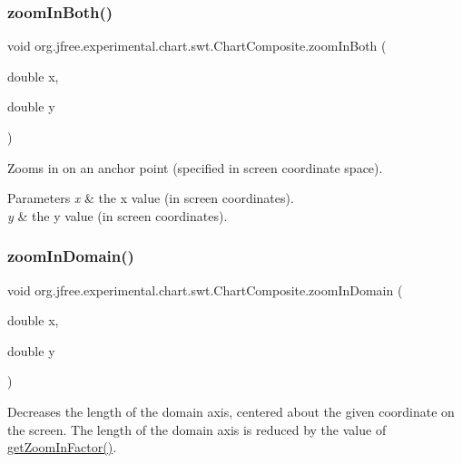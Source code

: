 \subsubsection{\texorpdfstring{zoom\+In\+Both()}{zoomInBoth()}}
{\footnotesize\ttfamily void org.\+jfree.\+experimental.\+chart.\+swt.\+Chart\+Composite.\+zoom\+In\+Both (\begin{DoxyParamCaption}\item[{double}]{x,  }\item[{double}]{y }\end{DoxyParamCaption})}

Zooms in on an anchor point (specified in screen coordinate space).


\begin{DoxyParams}{Parameters}
{\em x} & the x value (in screen coordinates). \\
\hline
{\em y} & the y value (in screen coordinates). \\
\hline
\end{DoxyParams}
\mbox{\label{classorg_1_1jfree_1_1experimental_1_1chart_1_1swt_1_1_chart_composite_ac4971a312b9a53f5648cb2d9864ef822}} 
\subsubsection{\texorpdfstring{zoom\+In\+Domain()}{zoomInDomain()}}
{\footnotesize\ttfamily void org.\+jfree.\+experimental.\+chart.\+swt.\+Chart\+Composite.\+zoom\+In\+Domain (\begin{DoxyParamCaption}\item[{double}]{x,  }\item[{double}]{y }\end{DoxyParamCaption})}

Decreases the length of the domain axis, centered about the given coordinate on the screen. The length of the domain axis is reduced by the value of \mbox{\hyperlink{classorg_1_1jfree_1_1experimental_1_1chart_1_1swt_1_1_chart_composite_a3cbdc5dd4939115b7ab7460273a5b43e}{get\+Zoom\+In\+Factor()}}.


